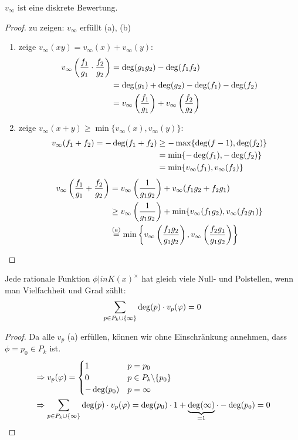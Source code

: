 \begin{lemma}
	$v_\infty$ ist eine diskrete Bewertung.
\end{lemma}
\begin{proof}
	zu zeigen: $v_\infty$ erfüllt  (a), (b)
	\begin{enumerate}[label=(\alph*)]
		\item zeige $v_\infty(xy) = v_\infty(x) + v_\infty(y)$:
		\begin{align}
			v_\infty\left(\frac{f_1}{g_1}\cdot\frac{f_2}{g_2}\right) &= \deg(g_1g_2) - \deg(f_1f_2) \notag \\
			&= \deg(g_1)+\deg(g_2) - \deg(f_1)-\deg(f_2)\notag \\
			&= v_\infty\left(\frac{f_1}{g_1}\right) + v_\infty\left(\frac{f_2}{g_2}\right)\notag
		\end{align}
		\item zeige $v_\infty(x+y) \ge \min \{v_\infty(x), v_\infty(y)\}$:
		\begin{align}
			v_\infty(f_1+f_2) = -\deg(f_1+f_2) &\ge -\max\{\deg(f-1),\deg(f_2)\}\notag \\
			&= \min\{-\deg(f_1),-\deg(f_2)\} \notag \\
			&= \min\{v_\infty(f_1),v_\infty(f_2)\} \notag
		\end{align}
		\begin{align}
			v_\infty\left(\frac{f_1}{g_1}+\frac{f_2}{g_2}\right) &= v_\infty\left(\frac{1}{g_1g_2}\right) + v_\infty(f_1g_2+f_2g_1) \notag \\
			&\ge v_\infty\left(\frac{1}{g_1g_2}\right) + \min\{v_\infty(f_1g_2),v_\infty(f_2g_1)\} \notag \\
			&\overset{(a)}{=} \min\left\lbrace v_\infty\left(\frac{f_1g_2}{g_1g_2}\right), v_\infty\left(\frac{f_2g_1}{g_1g_2}\right)\right\rbrace \notag
		\end{align}
	\end{enumerate}
\end{proof}

\begin{proposition}[Produktformel]
	Jede rationale Funktion $\phi|in K(x)^\times$ hat gleich viele Null- und Polstellen, wenn man Vielfachheit und Grad zählt:
	\begin{align}
		\sum_{p\in P_k\cup\{\infty\}} \deg(p)\cdot v_p(\phi) = 0\notag
	\end{align}
\end{proposition}
\begin{proof}
	Da alle $v_p$  (a) erfüllen, können wir ohne Einschränkung annehmen, dass $\phi = p_0\in P_k$ ist.
	\begin{align}
		&\Rightarrow v_p(\phi) = \begin{cases}
			1 & p = p_0 \\ 0 & p\in P_k\backslash\{p_0\} \\ -\deg(p_0) & p = \infty
		\end{cases} \notag \\
		&\Rightarrow \sum_{p\in P_k\cup\{\infty\}} \deg(p)\cdot v_p(\phi) = \deg(p_0)\cdot 1 + \underbrace{\deg(\infty)}_{=1}\cdot -\deg(p_0) = 0\notag
	\end{align}
\end{proof}

